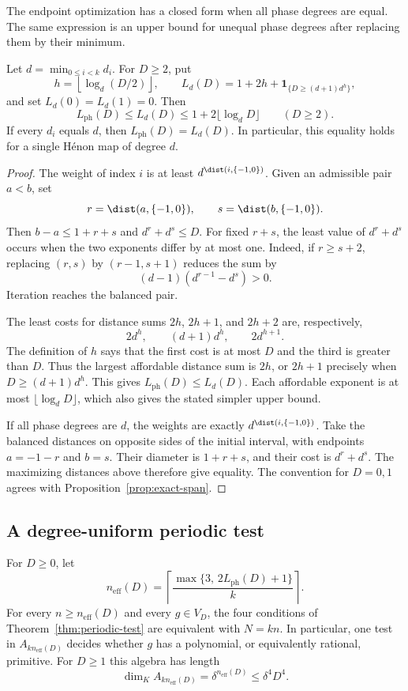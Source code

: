 The endpoint optimization has a closed form when all phase degrees are
equal.  The same expression is an upper bound for unequal phase degrees
after replacing them by their minimum.

\begin{proposition}\label{prop:scalar-span}
Let $d=\min_{0\le i<k}d_i$.  For $D\ge2$, put
\[
 h=\left\lfloor\log_d(D/2)\right\rfloor,
 \qquad
 L_d(D)=1+2h+\mathbf 1_{\{D\ge(d+1)d^h\}},
\]
and set $L_d(0)=L_d(1)=0$.  Then
\[
 L_{\mathrm{ph}}(D)\le L_d(D)
 \le1+2\lfloor\log_dD\rfloor\qquad(D\ge2).
\]
If every $d_i$ equals $d$, then $L_{\mathrm{ph}}(D)=L_d(D)$.
In particular, this equality holds for a single H\'enon map of degree $d$.
\end{proposition}

\begin{proof}
The weight of index $i$ is at least
$d^{\dist(i,\{-1,0\})}$.  Given an admissible pair $a<b$, set
\[
 r=\dist(a,\{-1,0\}),\qquad
 s=\dist(b,\{-1,0\}).
\]
Then $b-a\le1+r+s$ and $d^r+d^s\le D$.
For fixed $r+s$, the least value of $d^r+d^s$ occurs when the two
exponents differ by at most one.  Indeed, if $r\ge s+2$, replacing
$(r,s)$ by $(r-1,s+1)$ reduces the sum by
\[
 (d-1)(d^{r-1}-d^s)>0.
\]
Iteration reaches the balanced pair.

The least costs for distance sums $2h$, $2h+1$, and $2h+2$ are,
respectively,
\[
 2d^h,\qquad(d+1)d^h,\qquad2d^{h+1}.
\]
The definition of $h$ says that the first cost is at most $D$ and
the third is greater than $D$.  Thus the largest affordable distance
sum is $2h$, or $2h+1$ precisely when $D\ge(d+1)d^h$.
This gives $L_{\mathrm{ph}}(D)\le L_d(D)$.
Each affordable exponent is at most $\lfloor\log_dD\rfloor$,
which also gives the stated simpler upper bound.

If all phase degrees are $d$, the weights are exactly
$d^{\dist(i,\{-1,0\})}$.  Take the balanced distances on opposite
sides of the initial interval, with endpoints $a=-1-r$ and $b=s$.
Their diameter is $1+r+s$, and their cost is $d^r+d^s$.
The maximizing distances above therefore give equality.
The convention for $D=0,1$ agrees with
Proposition~\ref{prop:exact-span}.
\end{proof}

\subsection{A degree-uniform periodic test}

\begin{theorem}\label{thm:effective-period}
For $D\ge0$, let
\[
 n_{\mathrm{eff}}(D)
 =\left\lceil\frac{\max\{3,\,2L_{\mathrm{ph}}(D)+1\}}{k}\right\rceil.
\]
For every $n\ge n_{\mathrm{eff}}(D)$ and every $g\in V_D$,
the four conditions of Theorem~\ref{thm:periodic-test} are equivalent
with $N=kn$.  In particular, one test in $A_{kn_{\mathrm{eff}}(D)}$
decides whether $g$ has a polynomial, or equivalently rational,
primitive.  For $D\ge1$ this algebra has length
\[
 \dim_K A_{kn_{\mathrm{eff}}(D)}
 =\delta^{n_{\mathrm{eff}}(D)}\le\delta^4D^4.
\]
\end{theorem}

